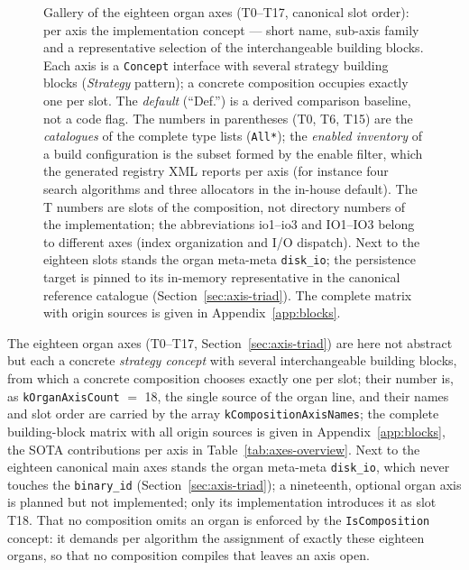 \begin{nurlang}
\begin{figure}[htbp]
\caption{Gallery of the eighteen organ axes (T0--T17, canonical slot order): per axis the implementation concept --- short name, sub-axis family and a representative selection of the interchangeable building blocks. Each axis is a \texttt{Concept} interface with several strategy building blocks (\emph{Strategy} pattern); a concrete composition occupies exactly one per slot. The \emph{default} (\enquote{Def.}) is a derived comparison baseline, not a code flag. The numbers in parentheses (T0, T6, T15) are the \emph{catalogues} of the complete type lists (\texttt{All*}); the \emph{enabled inventory} of a build configuration is the subset formed by the enable filter, which the generated registry XML reports per axis (for instance four search algorithms and three allocators in the in-house default). The T numbers are slots of the composition, not directory numbers of the implementation; the abbreviations io1--io3 and IO1--IO3 belong to different axes (index organization and I/O dispatch). Next to the eighteen slots stands the organ meta-meta \texttt{disk\_io}; the persistence target is pinned to its in-memory representative in the canonical reference catalogue (Section~\ref{sec:axis-triad}). The complete matrix with origin sources is given in Appendix~\ref{app:blocks}.}\label{fig:axes-gallery}
\end{figure}
\end{nurlang}
\begin{nurkurz}
The eighteen organ axes (T0--T17, Section~\ref{sec:axis-triad}) are here not abstract but each a
concrete \emph{strategy concept} with several interchangeable building blocks, from which a concrete
composition chooses exactly one per slot; their number is, as \texttt{kOrganAxisCount} $=$ 18, the
single source of the organ line, and their names and slot order are carried by the array
\texttt{kCompositionAxisNames}; the complete building-block matrix with all origin sources is given in
Appendix~\ref{app:blocks}, the SOTA contributions per axis in Table~\ref{tab:axes-overview}.
Next to the eighteen canonical main axes stands the organ meta-meta \texttt{disk\_io}, which never
touches the \texttt{binary\_id} (Section~\ref{sec:axis-triad}); a nineteenth, optional organ axis is
planned but not implemented; only its implementation introduces it as slot T18. That no composition
omits an organ is enforced by the \texttt{IsComposition} concept: it demands per algorithm the
assignment of exactly these eighteen organs, so that no composition compiles that leaves an axis open.
\end{nurkurz}

